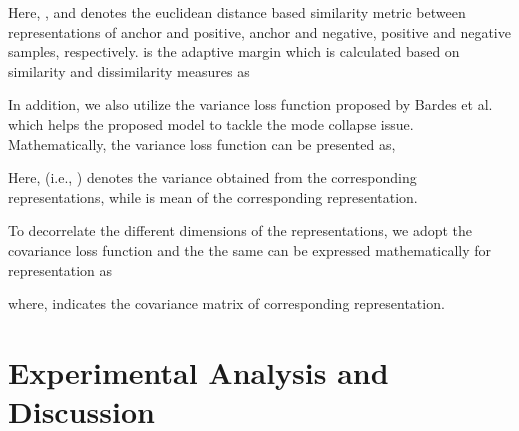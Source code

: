 \documentclass[10pt,twocolumn,letterpaper]{article}
\begin{document}
Here, ,  and  denotes the euclidean distance based similarity metric between representations of anchor and positive, anchor and negative, positive and negative samples, respectively.  is the adaptive margin which is calculated based on similarity and dissimilarity measures as


In addition, we also utilize the variance loss function proposed by Bardes et al. \cite{vicreg} which helps the proposed model to tackle the mode collapse issue. 
Mathematically, the variance loss function can be presented as,

Here,  (i.e., ) denotes the variance obtained from the corresponding representations, while  is mean of the corresponding representation.

To decorrelate the different dimensions of the representations, we adopt the covariance loss function \cite{vicreg} and the the same can be expressed mathematically for representation as

where,  indicates the covariance matrix of corresponding representation. 
\section{Experimental Analysis and Discussion}
\end{document}
